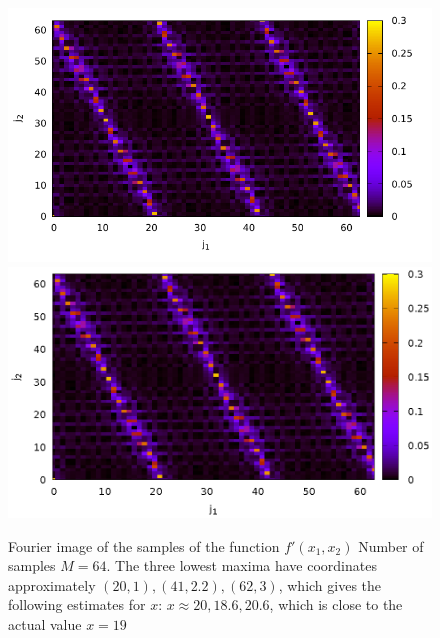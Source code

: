 \begin{figure}
\centering

\ifpdf
\includegraphics[angle=0]
{./part4/quantcomp/picdiscretlog4.pdf}
\else
\includegraphics[angle=0]
{./part4/quantcomp/picdiscretlog4.eps}
\fi

%

\caption{Fourier image of the samples of the function 
$f'(x_1, x_2)$
Number of samples $M=64$. The three lowest maxima have coordinates approximately $(20,1), (41,2.2), (62,
3)$, which gives the following estimates for $x$: $x \approx 20, 18.6, 20.6$,
which is close to the actual value $x = 19$
} 
\label{fig:part4:quantcomp:dl4}
\end{figure}